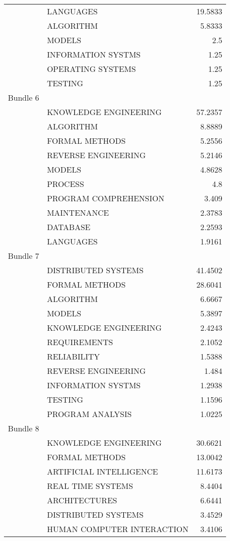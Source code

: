 \begin{center}
\begin{longtable}{|llr|}
 ~ & LANGUAGES & 19.5833 \\
 ~ & ALGORITHM & 5.8333 \\
 ~ & MODELS & 2.5 \\
 ~ & INFORMATION SYSTMS & 1.25 \\
 ~ & OPERATING SYSTEMS & 1.25 \\
 ~ & TESTING & 1.25 \\
Bundle 6 & ~ & ~ \\
 ~ & KNOWLEDGE ENGINEERING & 57.2357 \\
 ~ & ALGORITHM & 8.8889 \\
 ~ & FORMAL METHODS & 5.2556 \\
 ~ & REVERSE ENGINEERING & 5.2146 \\
 ~ & MODELS & 4.8628 \\
 ~ & PROCESS & 4.8 \\
 ~ & PROGRAM COMPREHENSION & 3.409 \\
 ~ & MAINTENANCE & 2.3783 \\
 ~ & DATABASE & 2.2593 \\
 ~ & LANGUAGES & 1.9161 \\
Bundle 7 & ~ & ~ \\
 ~ & DISTRIBUTED SYSTEMS & 41.4502 \\
 ~ & FORMAL METHODS & 28.6041 \\
 ~ & ALGORITHM & 6.6667 \\
 ~ & MODELS & 5.3897 \\
 ~ & KNOWLEDGE ENGINEERING & 2.4243 \\
 ~ & REQUIREMENTS & 2.1052 \\
 ~ & RELIABILITY & 1.5388 \\
 ~ & REVERSE ENGINEERING & 1.484 \\
 ~ & INFORMATION SYSTMS & 1.2938 \\
 ~ & TESTING & 1.1596 \\
 ~ & PROGRAM ANALYSIS & 1.0225 \\
Bundle 8 & ~ & ~ \\
 ~ & KNOWLEDGE ENGINEERING & 30.6621 \\
 ~ & FORMAL METHODS & 13.0042 \\
 ~ & ARTIFICIAL INTELLIGENCE & 11.6173 \\
 ~ & REAL TIME SYSTEMS & 8.4404 \\
 ~ & ARCHITECTURES & 6.6441 \\
 ~ & DISTRIBUTED SYSTEMS & 3.4529 \\
 ~ & HUMAN COMPUTER INTERACTION & 3.4106 \\

\end{longtable}
\end{center}
